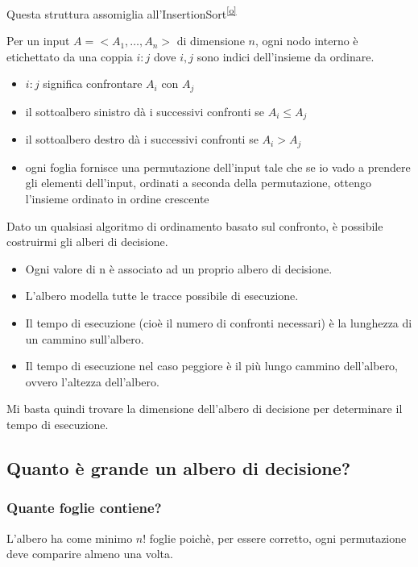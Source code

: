 {Questa struttura assomiglia all'InsertionSort}\textsuperscript{\protect\hyperlink{cmnt15}{{[}o{]}}}

{Per un input $A = <A_1,\ldots,A_n>$ di dimensione $n$, ogni nodo interno è etichettato da una coppia $i:j$ dove $i,j$ sono indici dell'insieme da ordinare.}

\begin{itemize}
\tightlist
\item
  {$i:j$ significa confrontare $A_i$ con $A_j$}
\item
  {il sottoalbero sinistro dà i successivi confronti se $A_i \leq A_j$}
\item
  {il sottoalbero destro dà i successivi confronti se $A_i > A_j$}
\item
  {ogni foglia fornisce una permutazione dell'input tale che se io vado a prendere gli elementi dell'input, ordinati a seconda della permutazione, ottengo l'insieme ordinato in ordine crescente}
\end{itemize}

{Dato un qualsiasi algoritmo di ordinamento basato sul confronto, è possibile costruirmi gli alberi di decisione.}

\begin{itemize}
\tightlist
\item
  {Ogni valore di n è associato ad un proprio albero di decisione.}
\item
  {L'albero modella tutte le tracce possibile di esecuzione.}
\item
  {Il tempo di esecuzione (cioè il numero di confronti necessari) è la lunghezza di un cammino sull'albero.}
\item
  {Il tempo di esecuzione nel caso peggiore è il più lungo cammino dell'albero, ovvero l'altezza dell'albero.}
\end{itemize}

{Mi basta quindi trovare la dimensione dell'albero di decisione per
determinare il tempo di esecuzione.}

\subsection{Quanto è grande un albero di decisione?}

\subsubsection{Quante foglie contiene?}

{L'albero ha come minimo $n!$ foglie poichè, per essere corretto, ogni permutazione deve comparire almeno una volta.}

